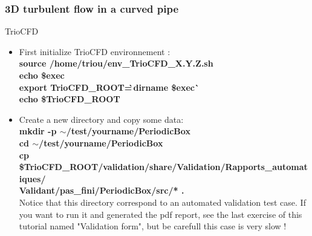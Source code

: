 \documentclass[10pt]{beamer}
\begin{document}
\begin{frame}
\frametitle{3D turbulent flow in a curved pipe}
\begin{block}{TrioCFD}

\begin{itemize}
\item First initialize TrioCFD environnement :\\
{\small{
\textbf{source /home/triou/env\_TrioCFD\_X.Y.Z.sh }\\
\textbf{echo \$exec} \\
\textbf{export TrioCFD\_ROOT=\`\,dirname \$exec\`} \\
\textbf{echo \$TrioCFD\_ROOT} \\
}}

\item Create a new directory and copy some data:\\
{\small{
\textbf{mkdir -p $\sim$/test/yourname/PeriodicBox} \\
\textbf{cd $\sim$/test/yourname/PeriodicBox} \\
\textbf{cp \$TrioCFD\_ROOT/validation/share/Validation/Rapports\_automatiques/} \\
\hspace{4cm} \textbf{Validant/pas\_fini/PeriodicBox/src/* \; .} \\
}}
\vspace{0.2cm}
Notice that this directory correspond to an automated validation test case. 
If you want to run it and generated the pdf report, see the last exercise of this tutorial named "Validation form", but be carefull this case is very slow !
\end{itemize}

\end{block}
\end{frame}
\end{document}
